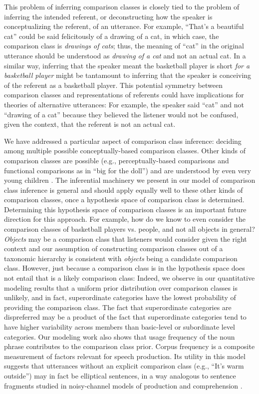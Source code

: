 \documentclass[doc]{apa6}
\begin{document}
This problem of inferring comparison classes is closely tied to the problem of inferring the intended referent, or deconstructing how the speaker is conceptualizing the referent, of an utterance.
For example, ``That's a beautiful cat'' could be said felicitously of a drawing of a cat, in which case, the comparison class is \emph{drawings of cats}; thus, the meaning of ``cat'' in the original utterance should be understood as \emph{drawing of a cat} and not an actual cat.
In a similar way, inferring that the speaker meant the basketball player is short \emph{for a basketball player} might be tantamount to inferring that the speaker is conceiving of the referent as a basketball player. 
This potential symmetry between comparison classes and representations of referents could have implications for theories of alternative utterances: For example, the speaker said ``cat'' and not ``drawing of a cat'' because they believed the listener would not be confused, given the context, that the referent is not an actual cat. 

We have addressed a particular aspect of comparison class inference: deciding among multiple possible conceptually-based comparison classes. 
Other kinds of comparison classes are possible (e.g., perceptually-based comparisons and functional comparisons as in ``big for the doll'') and are understood by even very young children \cite{Ebeling1994}.
The inferential machinery we present in our model of comparison class inference is general and should apply equally well to these other kinds of comparison classes, once a hypothesis space of comparison class is determined.
Determining this hypothesis space of comparison classes is an important future direction for this approach. 
For example, how do we know to even consider the comparison classes of basketball players vs. people, and not all objects in general? 
\emph{Objects} may be a comparison class that listeners would consider given the right context and our assumption of constructing comparison classes out of a taxonomic hierarchy is consistent with \emph{objects} being a candidate comparison class.
However, just because a comparison class is in the hypothesis space does not entail that is a likely comparison class: Indeed, we observe in our quantitative modeling results that a uniform prior distribution over comparison classes is unlikely, and in fact, superordinate categories have the lowest probability of providing the comparison class. 
The fact that superordinate categories are dispreferred may be a product of the fact that superordinate categories tend to have higher variability across members than basic-level or subordinate level categories. 
Our modeling work also shows that usage frequency of the noun phrase contributes to the comparison class prior. 
Corpus frequency is a composite measurement of factors relevant for speech production. 
Its utility in this model suggests that utterances without an explicit comparison class (e.g., ``It's warm outside'') may in fact be elliptical sentences, in a way analogous to sentence fragments studied in noisy-channel models of production and comprehension \cite{bergen2015strategic}. 
\end{document}
